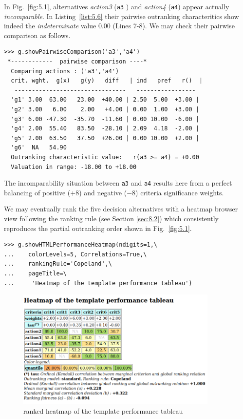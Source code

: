 In Fig.~\vref{fig:5.1}, alternatives \emph{action3} (\texttt{a3} ) and \emph{action4} (\texttt{a4}) appear actually \emph{incomparable}. In Listing~\vref{list:5.6} their pairwise outranking characteritics show indeed the \emph{indeterminate} value $0.00$ (Lines 7-8). We may check their pairwise comparison as follows.
\begin{lstlisting}
>>> g.showPairwiseComparison('a3','a4')
 *------------  pairwise comparison ----*
  Comparing actions : ('a3','a4')
  crit. wght.  g(x)   g(y)   diff   | ind   pref   r()  | 
   --------------------------------   -----------------
  'g1' 3.00  63.00   23.00  +40.00 | 2.50  5.00  +3.00 | 
  'g2' 3.00   6.00    2.00   +4.00 | 0.00  1.00  +3.00 | 
  'g3' 6.00 -47.30  -35.70  -11.60 | 0.00 10.00  -6.00 | 
  'g4' 2.00  55.40   83.50  -28.10 | 2.09  4.18  -2.00 | 
  'g5' 2.00  63.50   37.50  +26.00 | 0.00 10.00  +2.00 | 
  'g6'  NA   54.90
  Outranking characteristic value:   r(a3 >= a4) = +0.00
  Valuation in range: -18.00 to +18.00
\end{lstlisting}
The incomparability situation between \texttt{a3} and \texttt{a4} results here from a perfect balancing of positive ($+8$) and negative ($-8$) criteria significance weights.

We may eventually rank the five decision alternatives with a heatmap browser view following the \Copeland ranking rule (see Section \ref{sec:8.2}) which consistently reproduces the partial outranking order shown in Fig.~\vref{fig:5.1}. 
\begin{lstlisting}
>>> g.showHTMLPerformanceHeatmap(ndigits=1,\
...    colorLevels=5, Correlations=True,\
...    rankingRule='Copeland',\
...    pageTitle=\
...     'Heatmap of the template performance tableau')
\end{lstlisting}
\begin{figure}[h]
\includegraphics[width=10cm]{Figures/5-2-templateHeatmapCop.png}
\caption{\Copeland ranked heatmap of the template performance tableau}
\label{fig:5.2}       %
\end{figure}

